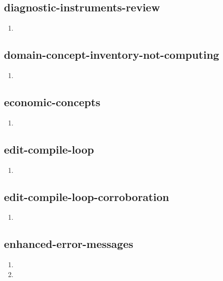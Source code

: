 \documentclass{article}
\begin{document}
\subsection{diagnostic-instruments-review}
\begin{enumerate}
\item {}
\end{enumerate}

\subsection{domain-concept-inventory-not-computing}
\begin{enumerate}
\item {}
\end{enumerate}

\subsection{economic-concepts}
\begin{enumerate}
\item {}
\end{enumerate}

\subsection{edit-compile-loop}
\begin{enumerate}
\item {}
\end{enumerate}

\subsection{edit-compile-loop-corroboration}
\begin{enumerate}
\item {}
\end{enumerate}

\subsection{enhanced-error-messages}
\begin{enumerate}
\item {}
\item {}
\end{enumerate}
\end{document}
